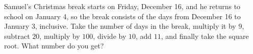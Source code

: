 Samuel's Christmas break starts on Friday, December 16, and he returns to school on January 4, so the break consists of the days from December 16 to January 3, inclusive. Take the number of days in the break, multiply it by $9$, subtract $20$, multiply by $100$, divide by $10$, add $11$, and finally take the square root. What number do you get?
